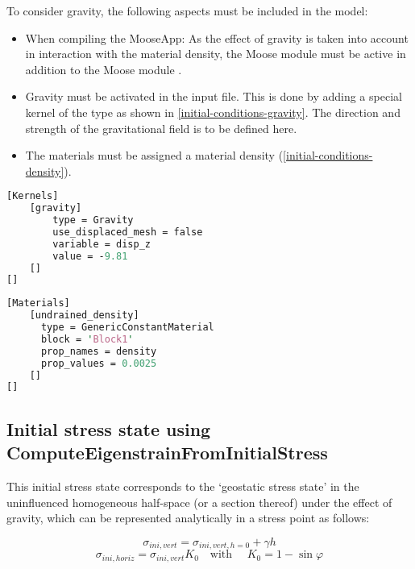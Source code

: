 To consider gravity, the following aspects must be included in the model:
\begin{itemize}
    \item When compiling the MooseApp: As the effect of gravity is taken into account in
          interaction with the material density, the Moose module  must be
          active in addition to the Moose module .
    \item Gravity must be activated in the input file. This is done by adding a special
          kernel of the type  as shown in
          \autoref{initial-conditions-gravity}. The direction and strength of the
          gravitational field is to be defined here.
    \item The materials must be assigned a material density
          (\autoref{initial-conditions-density}).
\end{itemize}

\begin{lstlisting}[language=perl, caption={Gravity kernel in a Moose inut file},label={initial-conditions-gravity}]
[Kernels]
    [gravity]
        type = Gravity
        use_displaced_mesh = false
        variable = disp_z
        value = -9.81
    []
[]
\end{lstlisting}

\begin{lstlisting}[language=perl, caption={Assignment of a density to subdomain ‘block1’},label={initial-conditions-density}]
[Materials]
    [undrained_density]
      type = GenericConstantMaterial
      block = 'Block1'
      prop_names = density
      prop_values = 0.0025
    []
[]
\end{lstlisting}

{\hfuzz=20pt
\subsection{Initial stress state using ComputeEigenstrainFromInitialStress}
}
\label{chap:IC-stress-state-simple}

This initial stress state corresponds to the ‘geostatic stress state’ in the
uninfluenced homogeneous half-space (or a section thereof) under the effect of
gravity, which can be represented analytically in a stress point as follows:

\begin{equation}
    \sigma_{ini,vert}=\sigma_{ini,vert,h=0}+\gamma h
\end{equation}
\begin{equation}
    \sigma_{ini,horiz}=\sigma_{ini,vert} K_0 \quad \text{with } \quad K_0 = 1-\sin\varphi
\end{equation}

